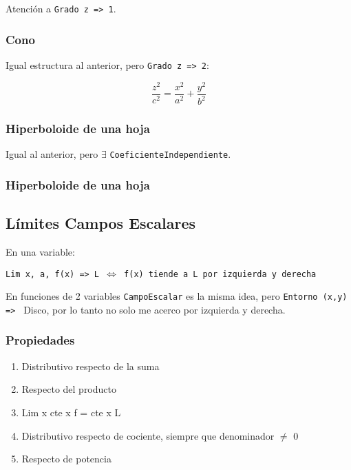 Atención a \texttt{Grado z => 1}.

\subsubsection{Cono}

Igual estructura al anterior, pero \texttt{Grado z => 2}:

\begin{equation*}
    \frac{z^{2}}{c^{2}} = \frac{x^{2}}{a^{2}} + \frac{y^{2}}{b^{2}}
\end{equation*}

\subsubsection{Hiperboloide de una hoja}

Igual al anterior, pero \(\exists\) \texttt{CoeficienteIndependiente}.

\subsubsection{Hiperboloide de una hoja}
 

\subsection{Límites Campos Escalares}

En una variable:

\texttt{Lim x, a, f(x) => L \(\iff\) f(x) tiende a L por izquierda y derecha} 

En funciones de 2 variables \texttt{CampoEscalar} es la misma idea,
pero \texttt{Entorno (x,y) => } Disco,
por lo tanto no solo me acerco por izquierda y derecha.

\subsubsection{Propiedades}

\begin{enumerate}
    \item Distributivo respecto de la suma
    \item Respecto del producto
    \item Lim x cte x f = cte x L
    \item Distributivo respecto de cociente, siempre que denominador \(\neq\) 0
    \item Respecto de potencia
\end{enumerate}

